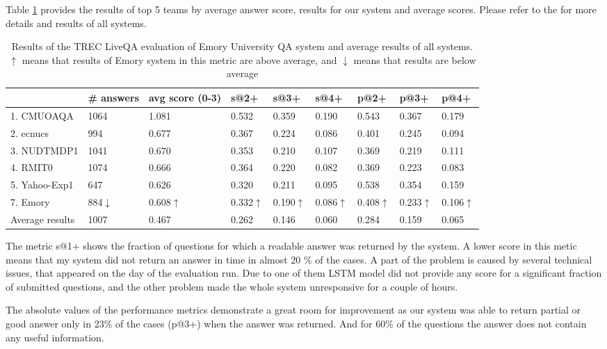 Table \ref{table:liveqa-results} provides the results of top 5 teams by average answer score, results for our system and average scores.
Please refer to the \cite{overviewliveqa15} for more details and results of all systems.

\begin{table}
	\centering
	\begin{tabular}{|p{3cm}|p{2cm}|p{1.3cm}|p{1.3cm}|p{1.3cm}|p{1.3cm}|p{1cm}|p{1cm}|p{1cm}|}
		\hline
		& \# answers & avg score (0-3) & s@2+ & s@3+ & s@4+ & p@2+ &  p@3+ & p@4+ \\
		\hline
		1. CMUOAQA & 1064 & 1.081 & 0.532 & 0.359 & 0.190 & 0.543 & 0.367 & 0.179 \\
		2. ecnucs & 994 & 0.677 & 0.367 & 0.224 & 0.086 & 0.401 & 0.245 & 0.094\\
		3. NUDTMDP1 & 1041 & 0.670 & 0.353 & 0.210 & 0.107 & 0.369 & 0.219 & 0.111\\
		4. RMIT0 & 1074 & 0.666 & 0.364 & 0.220 & 0.082 & 0.369 & 0.223 & 0.083\\
		5. Yahoo-Exp1 & 647 & 0.626 & 0.320 & 0.211 & 0.095 & 0.538 & 0.354 & 0.159\\
		\hline
		7. Emory & 884$\downarrow$ & 0.608$\uparrow$ & 0.332$\uparrow$ & 0.190$\uparrow$ & 0.086$\uparrow$ & 0.408$\uparrow$ & 0.233$\uparrow$ & 0.106$\uparrow$\\
		\hline
		Average results & 1007 & 0.467 & 0.262 & 0.146 & 0.060 & 0.284 & 0.159 & 0.065\\
		\hline
	\end{tabular}
\caption{Results of the TREC LiveQA evaluation of Emory University QA system and average results of all systems. $\uparrow$ means that results of Emory system in this metric are above average, and $\downarrow$ means that results are below average}
\label{table:liveqa-results}
\end{table}

The metric s@1+ shows the fraction of questions for which a readable answer was returned by the system.
A lower score in this metic means that my system did not return an answer in time in almost 20 \% of the cases.
A part of the problem is caused by several technical issues, that appeared on the day of the evaluation run.
Due to one of them LSTM model did not provide any score for a significant fraction of submitted questions, and the other problem made the whole system unresponsive for a couple of hours.

The absolute values of the performance metrics demonstrate a great room for improvement as our system was able to return partial or good answer only in 23\% of the cases (p@3+) when the answer was returned.
And for 60\% of the questions the answer does not contain any useful information.

